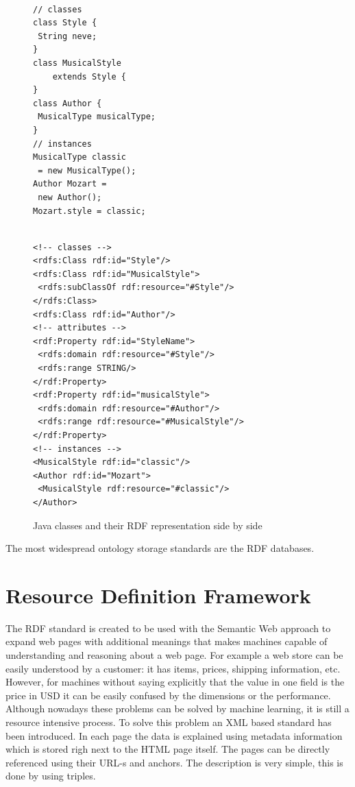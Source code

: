 \begin{figure}
        \centering
        \begin{minipage}[b]{0.4\textwidth}
\begin{verbatim}

// classes
class Style {
 String neve;
}
class MusicalStyle 
	extends Style {
}
class Author {
 MusicalType musicalType;
}
// instances
MusicalType classic
 = new MusicalType();
Author Mozart =
 new Author();
Mozart.style = classic;
\end{verbatim}

        \end{minipage}
        \begin{minipage}[b]{0.4\textwidth}
        \begin{verbatim}

<!-- classes -->
<rdfs:Class rdf:id="Style"/>
<rdfs:Class rdf:id="MusicalStyle">
 <rdfs:subClassOf rdf:resource="#Style"/>
</rdfs:Class>
<rdfs:Class rdf:id="Author"/>
<!-- attributes -->
<rdf:Property rdf:id="StyleName">
 <rdfs:domain rdf:resource="#Style"/>
 <rdfs:range STRING/>
</rdf:Property>
<rdf:Property rdf:id="musicalStyle">
 <rdfs:domain rdf:resource="#Author"/>
 <rdfs:range rdf:resource="#MusicalStyle"/>
</rdf:Property>
<!-- instances -->
<MusicalStyle rdf:id="classic"/>
<Author rdf:id="Mozart">
 <MusicalStyle rdf:resource="#classic"/>
</Author>               
\end{verbatim}

        \end{minipage} 
 \caption{Java classes and their RDF representation side by side}
                \label{fig:rdf}
\end{figure}
The most widespread ontology storage standards are the RDF databases.

\section{Resource Definition Framework}

The RDF standard\cite{rdf} is created to be used with the Semantic Web approach to expand web pages with additional meanings that makes machines capable of understanding and reasoning about a web page. For example a web store can be easily understood by a customer: it has items, prices, shipping information, etc. However, for machines without saying explicitly that the value in one field is the price in USD it can be easily confused by the dimensions or the performance. Although nowadays these problems can be solved by machine learning, it is still a resource intensive process. To solve this problem an XML based standard has been introduced. In each page the data is explained using metadata information which is stored righ next to the HTML page itself. The pages can be directly referenced using their URL-s and anchors. The description is very simple, this is done by using triples. 

